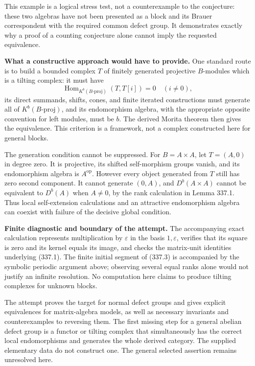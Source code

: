 \documentclass[11pt]{article}
\begin{document}
This example is a logical stress test, not a counterexample to the conjecture: these two algebras have not been presented as a block and its Brauer correspondent with the required common defect group. It demonstrates exactly why a proof of a counting conjecture alone cannot imply the requested equivalence.

\textbf{What a constructive approach would have to provide.} One standard route is to build a bounded complex $T$ of finitely generated projective $B$-modules which is a tilting complex: it must have
\[
 \operatorname{Hom}_{K^b(B\text{-}\mathrm{proj})}(T,T[i])=0
 \quad(i\ne0),
\]
its direct summands, shifts, cones, and finite iterated constructions must generate all of $K^b(B\text{-}\mathrm{proj})$, and its endomorphism algebra, with the appropriate opposite convention for left modules, must be $b$. The derived Morita theorem then gives the equivalence. This criterion is a framework, not a complex constructed here for general blocks.

The generation condition cannot be suppressed. For $B=A\times A$, let $T=(A,0)$ in degree zero. It is projective, its shifted self-morphism groups vanish, and its endomorphism algebra is $A^{\mathrm{op}}$. However every object generated from $T$ still has zero second component. It cannot generate $(0,A)$, and $D^b(A\times A)$ cannot be equivalent to $D^b(A)$ when $A\ne0$, by the rank calculation in Lemma 337.1. Thus local self-extension calculations and an attractive endomorphism algebra can coexist with failure of the decisive global condition.

\textbf{Finite diagnostic and boundary of the attempt.} The accompanying exact calculation represents multiplication by $\varepsilon$ in the basis $1,\varepsilon$, verifies that its square is zero and its kernel equals its image, and checks the matrix-unit identities underlying (337.1). The finite initial segment of (337.3) is accompanied by the symbolic periodic argument above; observing several equal ranks alone would not justify an infinite resolution. No computation here claims to produce tilting complexes for unknown blocks.

The attempt proves the target for normal defect groups and gives explicit equivalences for matrix-algebra models, as well as necessary invariants and counterexamples to reversing them. The first missing step for a general abelian defect group is a functor or tilting complex that simultaneously has the correct local endomorphisms and generates the whole derived category. The supplied elementary data do not construct one. The general selected assertion remains unresolved here.
\end{document}

